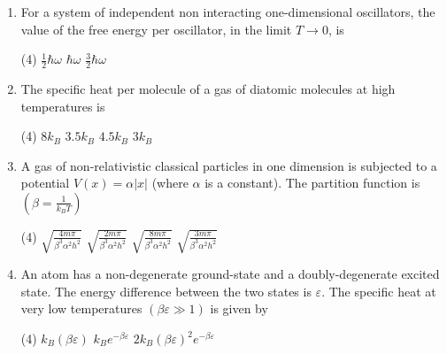 \begin{enumerate}
	$$
	N_{e}=c \int_{0}^{\infty} \frac{\epsilon^{\frac{(d-s)}{s}}}{\left(e^{\beta(\epsilon-\mu)}-1\right)} d \in
	$$
	where $c$ is a constant, should remain finite even for $\mu=0$. This can happen if
	{}
	\begin{tasks}(4)
		\task[\textbf{A.}] $\frac{d}{s}<\frac{1}{4}$
		\task[\textbf{B.}] $\frac{1}{4}<\frac{d}{s}<\frac{1}{2}$
		\task[\textbf{C.}] $\frac{d}{s}>1$
		\task[\textbf{D.}] $\frac{1}{2}<\frac{d}{s}<1$
	\end{tasks}
	\item For a system of independent non interacting one-dimensional oscillators, the value of the free energy per oscillator, in the limit $T \rightarrow 0$, is
	{}
	\begin{tasks}(4)
		\task[\textbf{A.}] $\frac{1}{2} \hbar \omega$
		\task[\textbf{B.}] $\hbar \omega$
		\task[\textbf{C.}] $\frac{3}{2} \hbar \omega$
	\end{tasks}
\item The specific heat per molecule of a gas of diatomic molecules at high temperatures is
{}
\begin{tasks}(4)
\task[\textbf{A.}] $8 k_{B}$
\task[\textbf{B.}] $3.5 k_{B}$
\task[\textbf{C.}] $4.5 k_{B}$
\task[\textbf{D.}] $3 k_{B}$
\end{tasks}
\item A gas of non-relativistic classical particles in one dimension is subjected to a potential $V(x)=\alpha|x|$ (where $\alpha$ is a constant). The partition function is $\left(\beta=\frac{1}{k_{B} T}\right)$
{}
\begin{tasks}(4)
\task[\textbf{A.}] $\sqrt{\frac{4 m \pi}{\beta^{3} \alpha^{2} h^{2}}}$
\task[\textbf{B.}] $\sqrt{\frac{2 m \pi}{\beta^{3} \alpha^{2} h^{2}}}$
\task[\textbf{C.}] $\sqrt{\frac{8 m \pi}{\beta^{3} \alpha^{2} h^{2}}}$
\task[\textbf{D.}] $\sqrt{\frac{3 m \pi}{\beta^{3} \alpha^{2} h^{2}}}$
\end{tasks}
\item An atom has a non-degenerate ground-state and a doubly-degenerate excited state. The energy difference between the two states is $\varepsilon$. The specific heat at very low temperatures $(\beta \varepsilon \gg 1)$ is given by
{}
\begin{tasks}(4)
\task[\textbf{A.}] $k_{B}(\beta \varepsilon)$
\task[\textbf{B.}] $k_{B} e^{-\beta \varepsilon}$
\task[\textbf{C.}] $2 k_{B}(\beta \varepsilon)^{2} e^{-\beta \varepsilon}$

\end{tasks}
\end{enumerate}
